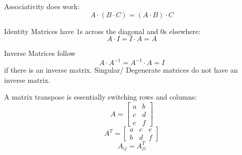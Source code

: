 \documentclass{article}
\begin{document}
Associativity does work:
$$
 A \cdot \left( B \cdot C \right) = \left( A \cdot B \right) \cdot C 
$$

Identity Matrices have 1s across the diagonal and 0s elsewhere:
$$
  A \cdot I = I \cdot A = A 
$$

Inverse Matrices follow
$$
 A \cdot A^{-1} = A^{-1} \cdot A =  I
$$
if there is an inverse matrix.
Singular/ Degenerate matrices do not have an inverse matrix.

A matrix transpose is essentially switching rows and columns:
$$
A =\begin{bmatrix} a & b \\ c & d \\ e & f\end{bmatrix}
$$
$$
A^T=\begin{bmatrix} a & c & e \\ b & d & f \end{bmatrix}
$$
$$
A_{ij} = A_{ji}^{T}
$$
\end{document}

